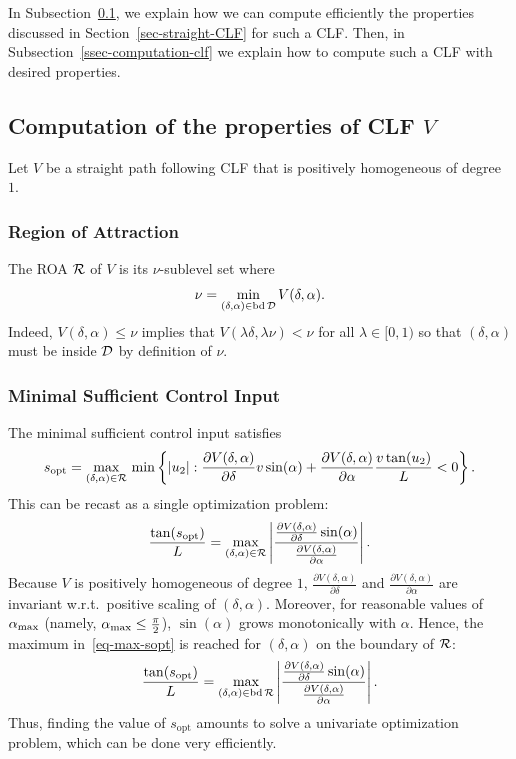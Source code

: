\documentclass{article}
\theoremstyle{plain}
\theoremstyle{definition}
\theoremstyle{remark}
\newcommand{\sopt}{s_{\mathrm{opt}}}
\newcommand{\alphamax}{\alpha_\maxtxt}
\begin{document}
In Subsection~\ref{ssec-computation-properties}, we explain how we can compute efficiently the properties
discussed in Section~\ref{sec-straight-CLF} for such a CLF.
Then, in Subsection~\ref{ssec-computation-clf} we explain how to compute such
a CLF with desired properties.

\subsection{Computation of the properties of CLF $V$}\label{ssec-computation-properties}

Let $V$ be a straight path following CLF that is positively homogeneous of degree $1$.

\subsubsection{Region of Attraction}

The ROA $\mathcal{R}$ of $V$ is its $\nu$-sublevel set where
\[
\nu=\min_{(\delta,\alpha)\in\mathrm{bd}\,\mathcal{D}} V(\delta,\alpha).
\]
Indeed, $V(\delta,\alpha)\leq\nu$ implies that $V(\lambda\delta,\lambda\nu)<\nu$
for all $\lambda\in[0,1)$ so that $(\delta,\alpha)$ must be inside $\mathcal{D}$ by definition of $\nu$.

\subsubsection{Minimal Sufficient Control Input}

The minimal sufficient control input satisfies
\[
\sopt=\max_{(\delta,\alpha)\in\calR}\,\min\left\{\lvert u_2\rvert:\frac{\partial V(\delta,\alpha)}{\partial\delta}v\sin(\alpha)+\frac{\partial V(\delta,\alpha)}{\partial\alpha}\frac{v\tan(u_2)}L<0\right\}.
\]
This can be recast as a single optimization problem:
\begin{equation}\label{eq-max-sopt}
\frac{\tan(\sopt)}L = \max_{(\delta,\alpha)\in\calR}\left\lvert\frac{\frac{\partial V(\delta,\alpha)}{\partial\delta}\sin(\alpha)}{\frac{\partial V(\delta,\alpha)}{\partial\alpha}}\right\rvert.
\end{equation}
Because $V$ is positively homogeneous of degree $1$,
$\frac{\partial V(\delta,\alpha)}{\partial\delta}$ and $\frac{\partial V(\delta,\alpha)}{\partial\alpha}$
are invariant w.r.t.~positive scaling of $(\delta,\alpha)$.
Moreover, for reasonable values of $\alphamax$ (namely, $\alphamax\leq\frac\pi2$),
$\sin(\alpha)$ grows monotonically with $\alpha$.
Hence, the maximum in~\eqref{eq-max-sopt} is reached for $(\delta,\alpha)$ on the boundary of $\mathcal{R}$:
\begin{equation}\label{eq-max-sopt-boundary}
\frac{\tan(\sopt)}L = \max_{(\delta,\alpha)\in\mathrm{bd}\,\calR}\left\lvert\frac{\frac{\partial V(\delta,\alpha)}{\partial\delta}\sin(\alpha)}{\frac{\partial V(\delta,\alpha)}{\partial\alpha}}\right\rvert.
\end{equation}
Thus, finding the value of $\sopt$ amounts to solve
a univariate optimization problem, which can be done very efficiently.
\end{document}
